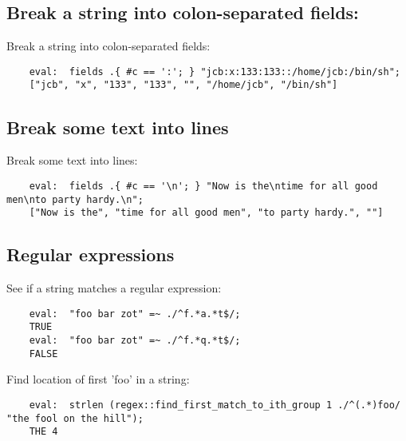 \cutend*


\subsection{Break a string into colon-separated fields:}

Break a string into colon-separated fields:
\begin{verbatim}
    eval:  fields .{ #c == ':'; } "jcb:x:133:133::/home/jcb:/bin/sh";
    ["jcb", "x", "133", "133", "", "/home/jcb", "/bin/sh"]
\end{verbatim}

\cutend*

\subsection{Break some text into lines}

Break some text into lines:
\begin{verbatim}
    eval:  fields .{ #c == '\n'; } "Now is the\ntime for all good men\nto party hardy.\n";
    ["Now is the", "time for all good men", "to party hardy.", ""]
\end{verbatim}

\cutend*

\subsection{Regular expressions}
\label{section:tut:recipe:regular-expressions}

See if a string matches a regular expression:
\begin{verbatim}
    eval:  "foo bar zot" =~ ./^f.*a.*t$/;
    TRUE
    eval:  "foo bar zot" =~ ./^f.*q.*t$/;
    FALSE
\end{verbatim}

Find location of first 'foo' in a string:

\begin{verbatim}
    eval:  strlen (regex::find_first_match_to_ith_group 1 ./^(.*)foo/ "the fool on the hill");
    THE 4
\end{verbatim}



